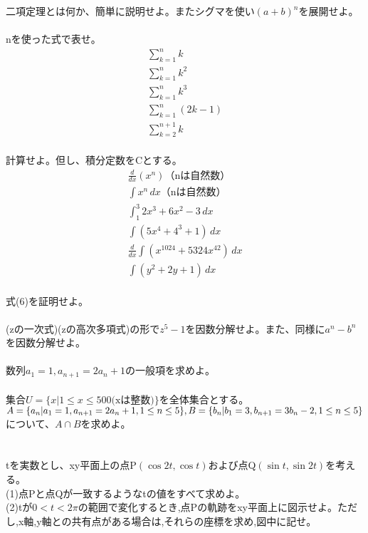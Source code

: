 \documentclass{ltjsarticle}
\begin{document}
二項定理とは何か、簡単に説明せよ。またシグマを使い$(a+b)^n$を展開せよ。\\
\\
nを使った式で表せ。\\
\begin{align}
  \sum_{k = 1}^{n} k  \\
  \sum_{k = 1}^{n} k^2 \\
  \sum_{k = 1}^{n} k^3 \\
  \sum_{k = 1}^{n} (2k-1) \\
  \sum_{k = 2}^{n+1} k  
\end{align}
\\
計算せよ。但し、積分定数をCとする。\\
\begin{align}
  \frac{d}{dx} (x^n) \text{（nは自然数）} \\
  \int x^n \,dx \text{（nは自然数）} \\
  \int_{1}^{3} 2x^3+6x^2-3 \,dx \\
  \int (5x^4+4^3+1) \,dx \\
  \frac{d}{dx} {\int (x^{1024}+5324x^{42})} \,dx \\
  \int (y^2+2y+1) \,dx 
\end{align}
\\
式(6)を証明せよ。\\
\\
(zの一次式)(zの高次多項式)の形で$z^5-1$を因数分解せよ。また、同様に$a^n-b^n$を因数分解せよ。\\
\\
数列$a_1=1,a_{n+1}=2a_n+1$の一般項を求めよ。\\
\\
集合$U=\{x | 1\leq x\leq500 \text{(xは整数)}\}$を全体集合とする。$\\A=\{a_n | a_1=1,a_{n+1}=2a_n+1,1\leq n \leq 5\},B=\{b_n | b_1=3,b_{n+1}=3b_n-2,1\leq n \leq 5\}$
について、$A \cap  B$を求めよ。 \\
\\
\\
tを実数とし、xy平面上の点P$(\cos 2t,\cos t)$および点Q$(\sin t,\sin 2t)$を考える。\\
(1)点Pと点Qが一致するようなtの値をすべて求めよ。\\
(2)tが$0 < t < 2\pi$の範囲で変化するとき,点Pの軌跡をxy平面上に図示せよ。ただし,x軸,y軸との共有点がある場合は,それらの座標を求め,図中に記せ。 
\end{document}

